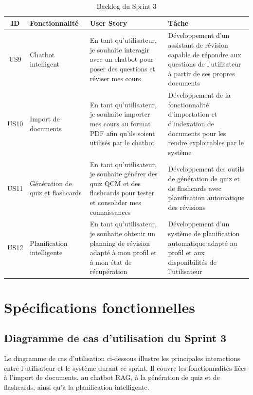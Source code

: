 \begin{table}[H]
\centering
\renewcommand{\arraystretch}{1.3}
\begin{tabular}{|c|p{3cm}|p{6cm}|p{4cm}|}
\hline
\textbf{ID} & \textbf{Fonctionnalité} & \textbf{User Story} & \textbf{Tâche} \\
\hline

US9 & Chatbot intelligent
& En tant qu'utilisateur, je souhaite interagir avec un chatbot pour poser des
  questions et réviser mes cours
& Développement d'un assistant de révision capable de répondre aux questions
  de l'utilisateur à partir de ses propres documents \\ \hline

US10 & Import de documents
& En tant qu'utilisateur, je souhaite importer mes cours au format PDF afin
  qu'ils soient utilisés par le chatbot
& Développement de la fonctionnalité d'importation et d'indexation de documents
  pour les rendre exploitables par le système \\ \hline

US11 & Génération de quiz et flashcards
& En tant qu'utilisateur, je souhaite générer des quiz QCM et des flashcards
  pour tester et consolider mes connaissances
& Développement des outils de génération de quiz et de flashcards avec
  planification automatique des révisions \\ \hline

US12 & Planification intelligente
& En tant qu'utilisateur, je souhaite obtenir un planning de révision adapté
  à mon profil et à mon état de récupération
& Développement d'un système de planification automatique adapté au profil
  et aux disponibilités de l'utilisateur \\ \hline

\end{tabular}
\caption{Backlog du Sprint 3}
\label{tab:backlogs3}
\end{table}

\section{Spécifications fonctionnelles}

\subsection{Diagramme de cas d'utilisation du Sprint 3}

Le diagramme de cas d'utilisation ci-dessous illustre les principales interactions
entre l'utilisateur et le système durant ce sprint. Il couvre les fonctionnalités
liées à l'import de documents, au chatbot RAG, à la génération de quiz et de
flashcards, ainsi qu'à la planification intelligente.

